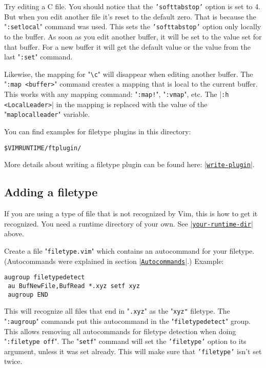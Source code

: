 Try editing a C file.
You should notice that the \texttt{'softtabstop'} option is set to 4.
But when you edit another file it's reset to the default zero.
That is because the "\texttt{:setlocal}" command was used.
This sets the \texttt{'softtabstop'} option only locally to the buffer.
As soon as you edit another buffer, it will be set to the value set for that buffer.
For a new buffer it will get the default value or the value from the last "\texttt{:set}" command.

Likewise, the mapping for "\texttt{\textbackslash{}c}" will disappear when editing another buffer.
The "\texttt{:map <buffer>}" command creates a mapping that is local to the current buffer.
This works with any mapping command: "\texttt{:map!}", "\texttt{:vmap}", etc.
The |\texttt{:h <LocalLeader>}| in the mapping is replaced with the value of the "\texttt{maplocalleader}" variable.

You can find examples for filetype plugins in this directory:

\begin{Verbatim}[samepage=true]
 $VIMRUNTIME/ftplugin/
\end{Verbatim}

More details about writing a filetype plugin can be found here: \hyperref[write-plugin]{|\texttt{write-plugin}|}.
\subsection{Adding a filetype}
\label{Adding a filetype}
If you are using a type of file that is not recognized by Vim, this is how to get it recognized.
You need a runtime directory of your own.
See \hyperref[your-runtime-dir]{|\texttt{your-runtime-dir}|} above.

Create a file "\texttt{filetype.vim}" which contains an autocommand for your filetype.
(Autocommands were explained in section |\hyperref[Autocommands]{\texttt{Autocommands}}|.)
Example:

\begin{Verbatim}[samepage=true]
 augroup filetypedetect
 au BufNewFile,BufRead *.xyz setf xyz
 augroup END
\end{Verbatim}

This will recognize all files that end in "\texttt{.xyz}" as the "\texttt{xyz"} filetype.
The "\texttt{:augroup}" commands put this autocommand in the "\texttt{filetypedetect}" group.
This allows removing all autocommands for filetype detection when doing "\texttt{:filetype off}".
The "\texttt{setf}" command will set the \texttt{'filetype'} option to its argument, unless it was set already.
This will make sure that \texttt{'filetype'} isn't set twice.

